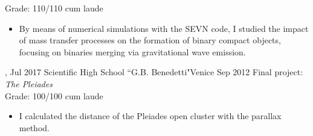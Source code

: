 \begin{experiences}
{    Grade: 110/110 cum laude  %
    }{
    \begin{itemize}
        \item  By means of numerical simulations with the SEVN code, I studied the impact of mass transfer processes on the formation of binary compact objects, focusing on binaries merging via gravitational wave emission.
    \end{itemize}
   }{,}
  \emptySeparator
    \experience
    {Jul 2017}   {Scientific High School ``G.B. Benedetti"}{Venice}
    {Sep 2012} 
    {Final project: \textit{The Pleiades} \\
    Grade: 100/100 cum laude }{    
    \begin{itemize}
        \item I calculated the distance of the Pleiades open cluster with the parallax method.
    \end{itemize}
    } 
\end{experiences}
